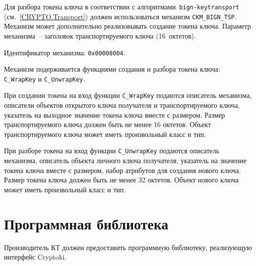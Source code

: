 Для разбора токена ключа в соответствии с алгоритмами~\texttt{bign-keytransport}
(см.~\ref{CRYPTO.Transport}) должен использоваться механизм \verb|CKM_BIGN_TSP|. 
Механизм может дополнительно реализовывать создание токена ключа.
%
Параметр механизма~-- заголовок транспортируемого ключа (16~октетов). 

Идентификатор механизма: \texttt{0x00008004}.

Механизм подерживается функциями создания и разбора токена ключа:
\verb|C_WrapKey| и \verb|C_UnwrapKey|.

При создании токена на вход функции \verb|C_WrapKey| подаются
описатель механизма, описатели объектов открытого ключа
получателя и транспортируемого ключа, указатель на
выходное значение токена ключа вместе с размером.
Размер транспортируемого ключа должен быть не менее 16 октетов.
Объект транспортируемого ключа может иметь произвольный класс и тип.

При разборе токена на вход функции \verb|C_UnwrapKey| подаются
описатель механизма, описатель объекта личного ключа
получателя, указатель на значение токена ключа вместе с размером,
набор атрибутов для создания нового ключа.
Размер токена ключа должен быть не менее 32 октетов.
Объект нового ключа может иметь произвольный класс и тип.

\section{Программная библиотека}

Производитель КТ должен предоставить программную библиотеку, реализующую
интерфейс Cryptoki. 

